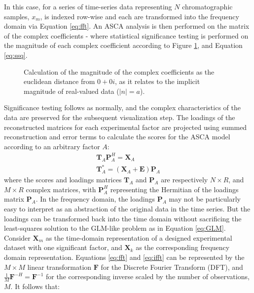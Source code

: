 \documentclass[preprint,12pt]{elsarticle}
\begin{document}
In this case, for a series of time-series data representing $N$ chromatographic samples, $x_m$, is indexed row-wise and each are transformed into the frequency domain via Equation \ref{eq:fft}. An ASCA analysis is then performed on the matrix of the complex coefficients - where statistical significance testing is performed on the magnitude of each complex coefficient according to Figure \ref{fig:imag}, and Equation \ref{eq:ssq}.

\begin{figure}[tbh!]
\centering


\caption{Calculation of the magnitude of the complex coefficients as the euclidean distance from $0 + 0i$, as it relates to the implicit magnitude of real-valued data ($|n|=a$).}
\label{fig:imag}
\end{figure}

Significance testing follows as normally, and the complex characteristics of the data are preserved for the subsequent visualization step. The loadings of the reconstructed matrices for each experimental factor are projected using summed reconstruction and error terms to calculate the scores for the ASCA model according to an arbitrary factor $A$:
%
\begin{align}\label{eq:asca}
    \mathbf{T}_A\mathbf{P}_A^H = \mathbf{X}_A \\
    \mathbf{T}^*_A = (\mathbf{X}_A + \mathbf{E})\mathbf{P}_A
\end{align}
%
\noindent where the scores and loadings matrices $\mathbf{T}_A$ and $\mathbf{P}_A$ are respectively $N \times R$, and $M \times R$ complex matrices, with $\mathbf{P}_A^H$ representing the Hermitian of the loadings matrix $\mathbf{P}_A$. In the frequency domain, the loadings $\mathbf{P}_A$ may not be particularly easy to interpret as an abstraction of the original data in the time series. But the loadings can be transformed back into the time domain without sacrificing the least-squares solution to the GLM-like problem as in Equation \ref{eq:GLM}. Consider $\mathbf{X}_m$ as the time-domain representation of a designed experimental dataset with one significant factor, and $\mathbf{X}_k$ as the corresponding frequency domain representation. Equations \ref{eq:fft} and \ref{eq:ifft} can be represented by the $M\times M$ linear transformation $\mathbf{F}$ for the Discrete Fourier Transform (DFT), and $\frac{1}{M}\mathbf{F}^{-H} = \mathbf{F}^{-1}$ for the corresponding inverse scaled by the number of observations, $M$. It follows that:
\end{document}
